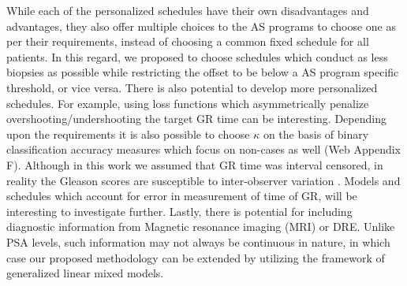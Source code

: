 While each of the personalized schedules have their own disadvantages and advantages, they also offer multiple choices to the AS programs to choose one as per their requirements, instead of choosing a common fixed schedule for all patients. In this regard, we proposed to choose schedules which conduct as less biopsies as possible while restricting the offset to be below a AS program specific threshold, or vice versa. There is also potential to develop more personalized schedules. For example, using loss functions which asymmetrically penalize overshooting/undershooting the target GR time can be interesting. Depending upon the requirements it is also possible to choose $\kappa$ on the basis of binary classification accuracy measures which focus on non-cases as well (Web Appendix F). Although in this work we assumed that GR time was interval censored, in reality the Gleason scores are susceptible to inter-observer variation \citep{Gleason_interobs_var}. Models and schedules which account for error in measurement of time of GR, will be interesting to investigate further. Lastly, there is potential for including diagnostic information from Magnetic resonance imaging (MRI) or DRE. Unlike PSA levels, such information may not always be continuous in nature, in which case our proposed methodology can be extended by utilizing the framework of generalized linear mixed models.